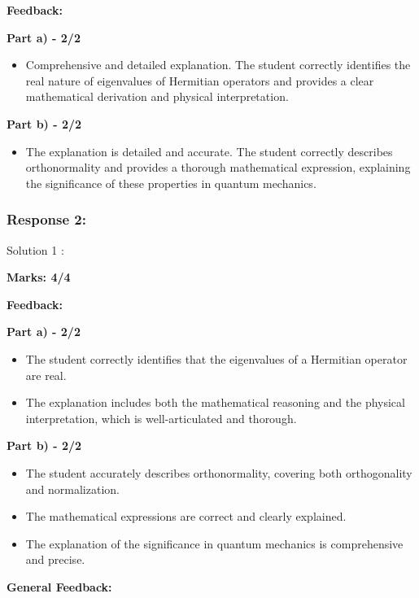 \documentclass[a4paper,11pt]{article}
\begin{document}
\textbf{Feedback:}

\textbf{Part a) - 2/2}

\begin{itemize}
    \item Comprehensive and detailed explanation. The student correctly identifies the real nature of eigenvalues of Hermitian operators and provides a clear mathematical derivation and physical interpretation.
\end{itemize}

\textbf{Part b) - 2/2}

\begin{itemize}
    \item The explanation is detailed and accurate. The student correctly describes orthonormality and provides a thorough mathematical expression, explaining the significance of these properties in quantum mechanics.
\end{itemize}



\subsubsection*{Response 2:}

Solution 1 :

\textbf{Marks: 4/4}

\textbf{Feedback:}

\textbf{Part a) - 2/2}

\begin{itemize}
    \item The student correctly identifies that the eigenvalues of a Hermitian operator are real.
    \item The explanation includes both the mathematical reasoning and the physical interpretation, which is well-articulated and thorough.
\end{itemize}

\textbf{Part b) - 2/2}

\begin{itemize}
    \item The student accurately describes orthonormality, covering both orthogonality and normalization.
    \item The mathematical expressions are correct and clearly explained.
    \item The explanation of the significance in quantum mechanics is comprehensive and precise.
\end{itemize}

\textbf{General Feedback:}
\end{document}
